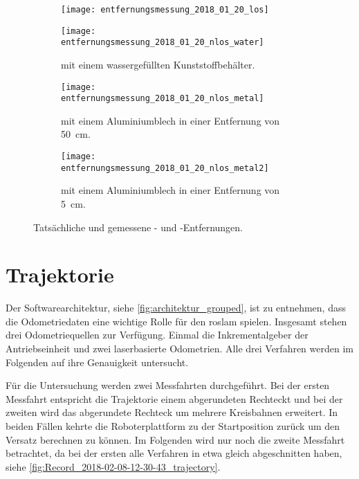 \begin{figure}[ht]
	\centering
	\begin{subfigure}[t]{0.49\linewidth}
		\centering
		\texttt{[image: entfernungsmessung\_2018\_01\_20\_los]}
		\caption{}
		\label{fig:entfernungsmessung_2018_01_20_los}
	\end{subfigure}
	\hfill
	\begin{subfigure}[b]{0.49\linewidth}
		\centering
		\texttt{[image: entfernungsmessung\_2018\_01\_20\_nlos\_water]}
		\caption{ mit einem wassergefüllten Kunststoffbehälter.}
		\label{fig:entfernungsmessung_2018_01_20_nlos_water}
	\end{subfigure}
	\par
	\bigskip
	\begin{subfigure}[b]{0.49\linewidth}
		\centering
		\texttt{[image: entfernungsmessung\_2018\_01\_20\_nlos\_metal]}
		\caption{ mit einem Aluminiumblech in einer Entfernung von \SI{50}{\centi\meter}.}
		\label{fig:entfernungsmessung_2018_01_20_nlos_metal}
	\end{subfigure}
	\hfill
	\begin{subfigure}[b]{0.49\linewidth}
		\centering
		\texttt{[image: entfernungsmessung\_2018\_01\_20\_nlos\_metal2]}
		\caption{ mit einem Aluminiumblech in einer Entfernung von \SI{5}{\centi\meter}.}
		\label{fig:entfernungsmessung_2018_01_20_nlos_metal2}
	\end{subfigure}
	\caption{Tatsächliche und gemessene - und -Entfernungen.}
	\label{fig:entfernungsmessung_2018_01_20}
\end{figure}


%
%
%
\section{Trajektorie}

Der Softwarearchitektur, siehe \autoref{fig:architektur_grouped}, ist zu entnehmen, dass die Odometriedaten eine wichtige Rolle für den \gls{roslam} spielen. Insgesamt stehen drei Odometriequellen zur Verfügung. Einmal die Inkrementalgeber der Antriebseinheit und zwei laserbasierte Odometrien. Alle drei Verfahren werden im Folgenden auf ihre Genauigkeit untersucht.

Für die Untersuchung werden zwei Messfahrten durchgeführt. Bei der ersten Messfahrt entspricht die Trajektorie einem abgerundeten Rechteckt und bei der zweiten wird das abgerundete Rechteck um mehrere Kreisbahnen erweitert. In beiden Fällen kehrte die Roboterplattform zu der Startposition zurück um den Versatz berechnen zu können. Im Folgenden wird nur noch die zweite Messfahrt betrachtet, da bei der ersten alle Verfahren in etwa gleich abgeschnitten haben, siehe \autoref{fig:Record_2018-02-08-12-30-43_trajectory}.

